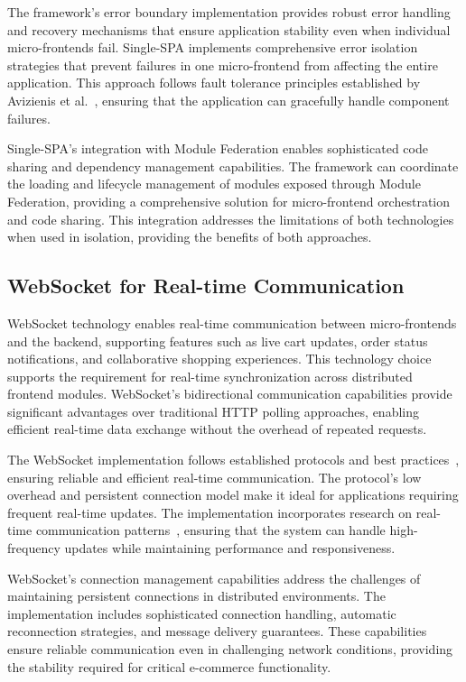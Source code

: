 \documentclass[12pt,a4paper]{report}
\begin{document}
The framework's error boundary implementation provides robust error handling and recovery mechanisms that ensure application stability even when individual micro-frontends fail. Single-SPA implements comprehensive error isolation strategies that prevent failures in one micro-frontend from affecting the entire application. This approach follows fault tolerance principles established by Avizienis et al.~\cite{avizienis2004basic}, ensuring that the application can gracefully handle component failures.

Single-SPA's integration with Module Federation enables sophisticated code sharing and dependency management capabilities. The framework can coordinate the loading and lifecycle management of modules exposed through Module Federation, providing a comprehensive solution for micro-frontend orchestration and code sharing. This integration addresses the limitations of both technologies when used in isolation, providing the benefits of both approaches.

\subsection{WebSocket for Real-time Communication}

WebSocket technology enables real-time communication between micro-frontends and the backend, supporting features such as live cart updates, order status notifications, and collaborative shopping experiences. This technology choice supports the requirement for real-time synchronization across distributed frontend modules. WebSocket's bidirectional communication capabilities provide significant advantages over traditional HTTP polling approaches, enabling efficient real-time data exchange without the overhead of repeated requests.

The WebSocket implementation follows established protocols and best practices~\cite{fette2011websocket}, ensuring reliable and efficient real-time communication. The protocol's low overhead and persistent connection model make it ideal for applications requiring frequent real-time updates. The implementation incorporates research on real-time communication patterns~\cite{allen2010real}, ensuring that the system can handle high-frequency updates while maintaining performance and responsiveness.

WebSocket's connection management capabilities address the challenges of maintaining persistent connections in distributed environments. The implementation includes sophisticated connection handling, automatic reconnection strategies, and message delivery guarantees. These capabilities ensure reliable communication even in challenging network conditions, providing the stability required for critical e-commerce functionality.
\end{document}
